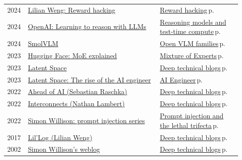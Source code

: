 \documentclass[10pt,a4paper,openany]{report}
\begin{document}
{\begin{longtable}{@{}p{0.07\linewidth}>{\raggedright}p{0.55\linewidth}>{\raggedright\arraybackslash}p{0.34\linewidth}@{}}
2024 & \href{https://lilianweng.github.io/posts/2024-11-28-reward-hacking/}{Lilian Weng: Reward hacking} & \hyperref[c:reasoning-9]{Reward hacking}\,{\color{muted}\scriptsize p.\,\pageref{c:reasoning-9}}\\
2024 & \href{https://openai.com/index/learning-to-reason-with-llms/}{OpenAI: Learning to reason with LLMs} & \hyperref[c:reasoning-0]{Reasoning models and test-time compute}\,{\color{muted}\scriptsize p.\,\pageref{c:reasoning-0}}\\
2024 & \href{https://huggingface.co/blog/smolvlm}{SmolVLM} & \hyperref[c:vlm-1]{Open VLM families}\,{\color{muted}\scriptsize p.\,\pageref{c:vlm-1}}\\
2023 & \href{https://huggingface.co/blog/moe}{Hugging Face: MoE explained} & \hyperref[c:arch-0]{Mixture of Experts}\,{\color{muted}\scriptsize p.\,\pageref{c:arch-0}}\\
2023 & \href{https://www.latent.space}{Latent Space} & \hyperref[c:learn-0]{Deep technical blogs}\,{\color{muted}\scriptsize p.\,\pageref{c:learn-0}}\\
2023 & \href{https://www.latent.space/p/ai-engineer}{Latent Space: The rise of the AI engineer} & \hyperref[c:practice-1]{AI Engineer}\,{\color{muted}\scriptsize p.\,\pageref{c:practice-1}}\\
2022 & \href{https://magazine.sebastianraschka.com}{Ahead of AI (Sebastian Raschka)} & \hyperref[c:learn-0]{Deep technical blogs}\,{\color{muted}\scriptsize p.\,\pageref{c:learn-0}}\\
2022 & \href{https://www.interconnects.ai}{Interconnects (Nathan Lambert)} & \hyperref[c:learn-0]{Deep technical blogs}\,{\color{muted}\scriptsize p.\,\pageref{c:learn-0}}\\
2022 & \href{https://simonwillison.net/series/prompt-injection/}{Simon Willison: prompt injection series} & \hyperref[c:safety-3]{Prompt injection and the lethal trifecta}\,{\color{muted}\scriptsize p.\,\pageref{c:safety-3}}\\
2017 & \href{https://lilianweng.github.io}{Lil'Log (Lilian Weng)} & \hyperref[c:learn-0]{Deep technical blogs}\,{\color{muted}\scriptsize p.\,\pageref{c:learn-0}}\\
2002 & \href{https://simonwillison.net}{Simon Willison's weblog} & \hyperref[c:learn-0]{Deep technical blogs}\,{\color{muted}\scriptsize p.\,\pageref{c:learn-0}}\\
\end{longtable}}
\end{document}
